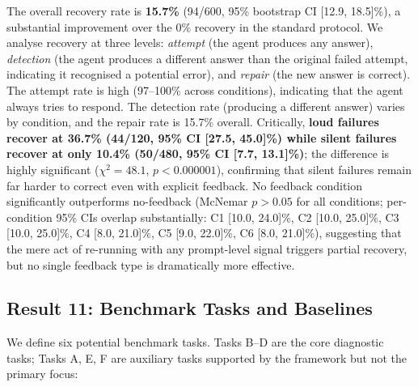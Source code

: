 The overall recovery rate is \textbf{15.7\%} (94/600, 95\% bootstrap CI [12.9, 18.5]\%), a substantial improvement over the 0\% recovery in the standard protocol. We analyse recovery at three levels: \emph{attempt} (the agent produces any answer), \emph{detection} (the agent produces a different answer than the original failed attempt, indicating it recognised a potential error), and \emph{repair} (the new answer is correct). The attempt rate is high (97--100\% across conditions), indicating that the agent always tries to respond. The detection rate (producing a different answer) varies by condition, and the repair rate is 15.7\% overall. Critically, \textbf{loud failures recover at 36.7\% (44/120, 95\% CI [27.5, 45.0]\%) while silent failures recover at only 10.4\% (50/480, 95\% CI [7.7, 13.1]\%)}; the difference is highly significant ($\chi^2 = 48.1$, $p < 0.000001$), confirming that silent failures remain far harder to correct even with explicit feedback. No feedback condition significantly outperforms no-feedback (McNemar $p > 0.05$ for all conditions; per-condition 95\% CIs overlap substantially: C1 [10.0, 24.0]\%, C2 [10.0, 25.0]\%, C3 [10.0, 25.0]\%, C4 [8.0, 21.0]\%, C5 [9.0, 22.0]\%, C6 [8.0, 21.0]\%), suggesting that the mere act of re-running with any prompt-level signal triggers partial recovery, but no single feedback type is dramatically more effective.

\FloatBarrier

\subsection{Result 11: Benchmark Tasks and Baselines}
\label{sec:res-benchmark}

We define six potential benchmark tasks. Tasks B--D are the core diagnostic tasks; Tasks A, E, F are auxiliary tasks supported by the framework but not the primary focus:

